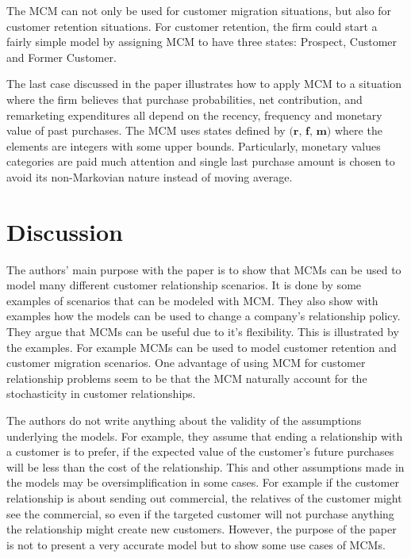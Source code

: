 \documentclass[11pt]{article}
\begin{document}
The MCM can not only be used for customer migration situations, but also for customer retention situations. For customer retention, the firm could start a fairly simple model by assigning MCM to have three states:  Prospect, Customer and Former Customer. 

The last case discussed in the paper illustrates how to apply MCM to a situation where the firm believes that purchase probabilities, net contribution, and remarketing expenditures all depend on the recency, frequency and monetary value of past purchases. The MCM uses states defined by $\textbf{(r, f, m)}$ where the elements are integers with some upper bounds. Particularly, monetary values categories are paid much attention and single last purchase amount is chosen to avoid its non-Markovian nature instead of moving average.




\section{Discussion}


The authors' main purpose with the paper is to show that MCMs can be used to model many different customer relationship scenarios. It is done by some examples of scenarios that can be modeled with MCM. They also show with examples how the models can be used to change a company's relationship policy. They argue that MCMs can be useful due to it's flexibility. This is illustrated by the examples. For example MCMs can be used to model customer retention and customer migration scenarios. One advantage of using MCM for customer relationship problems seem to be that the MCM naturally account for the stochasticity in customer relationships.

The authors do not write anything about the validity of the assumptions underlying the models. For example, they assume that ending a relationship with a customer is to prefer, if the expected value of the customer's future purchases will be less than the cost of the relationship. This and other assumptions made in the models may be oversimplification in some cases. For example if the customer relationship is about sending out commercial, the relatives of the customer might see the commercial, so even if the targeted customer will not purchase anything the relationship might create new customers. However, the purpose of the paper is not to present a very accurate model but to show some use cases of MCMs.

\end{document}
